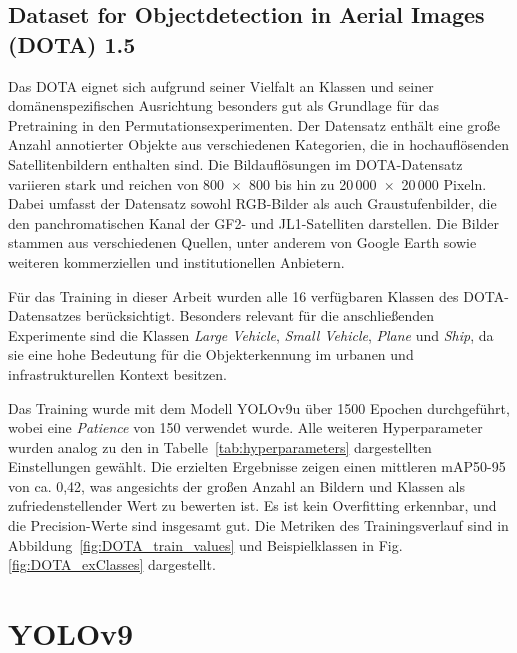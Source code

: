 \subsection{Dataset for Objectdetection in Aerial Images (DOTA) 1.5}
\label{subsec:DOTA}
Das \Acrfull{DOTA} eignet sich aufgrund seiner Vielfalt an Klassen und seiner domänenspezifischen Ausrichtung besonders gut als Grundlage für das Pretraining in den Permutationsexperimenten. Der Datensatz enthält eine große Anzahl annotierter Objekte aus verschiedenen Kategorien, die in hochauflösenden Satellitenbildern enthalten sind. Die Bildauflösungen im \acrshort{DOTA}-Datensatz variieren stark und reichen von 800~$\times$~800 bis hin zu 20\,000~$\times$~20\,000 Pixeln. Dabei umfasst der Datensatz sowohl \acrshort{RGB}-Bilder als auch Graustufenbilder, die den panchromatischen Kanal der GF2- und JL1-Satelliten darstellen. Die Bilder stammen aus verschiedenen Quellen, unter anderem von Google Earth sowie weiteren kommerziellen und institutionellen Anbietern.

Für das Training in dieser Arbeit wurden alle 16 verfügbaren Klassen des DOTA-Datensatzes berücksichtigt. Besonders relevant für die anschließenden Experimente sind die Klassen \textit{Large Vehicle}, \textit{Small Vehicle}, \textit{Plane} und \textit{Ship}, da sie eine hohe Bedeutung für die Objekterkennung im urbanen und infrastrukturellen Kontext besitzen.

Das Training wurde mit dem Modell \acrshort{YOLO}v9u über 1500 Epochen durchgeführt, wobei eine \textit{Patience} von 150 verwendet wurde. Alle weiteren Hyperparameter wurden analog zu den in Tabelle~\ref{tab:hyperparameters} dargestellten Einstellungen gewählt. Die erzielten Ergebnisse zeigen einen mittleren \acrshort{mAP}50-95 von ca. 0,42, was angesichts der großen Anzahl an Bildern und Klassen als zufriedenstellender Wert zu bewerten ist. Es ist kein Overfitting erkennbar, und die Precision-Werte sind insgesamt gut. Die Metriken des Trainingsverlauf sind in Abbildung~\ref{fig:DOTA_train_values} und Beispielklassen in Fig. \ref{fig:DOTA_exClasses} dargestellt.





\section{YOLOv9}
\label{sec:yolov9}

